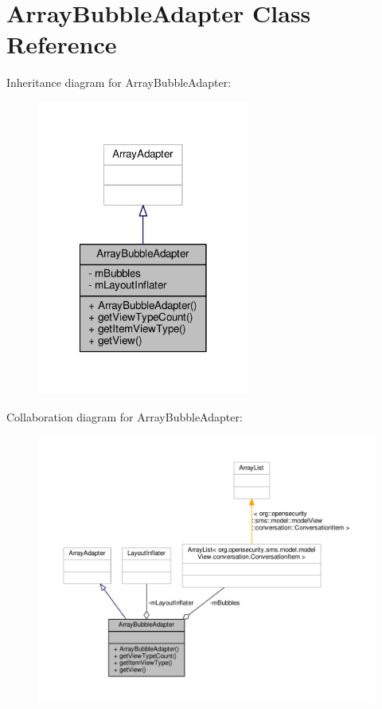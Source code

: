 \hypertarget{a00002}{\section{Array\+Bubble\+Adapter Class Reference}
\label{a00002}
}


Inheritance diagram for Array\+Bubble\+Adapter\+:
\nopagebreak
\begin{figure}[H]
\begin{center}
\leavevmode
\includegraphics[width=198pt]{a00056}
\end{center}
\end{figure}


Collaboration diagram for Array\+Bubble\+Adapter\+:
\nopagebreak
\begin{figure}[H]
\begin{center}
\leavevmode
\includegraphics[width=350pt]{a00057}
\end{center}
\end{figure}
